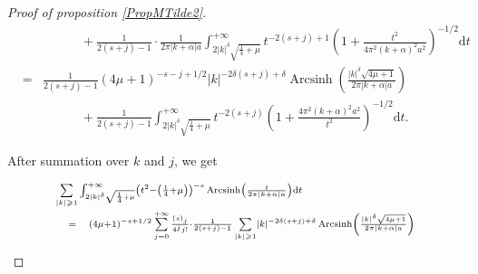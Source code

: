 \documentclass{jams-l}
\theoremstyle{definition}
\theoremstyle{remark}
\numberwithin{equation}{section}
\DeclareMathOperator{\arcsinh}{Arcsinh}
\begin{document}
\begin{proof}[Proof of proposition \ref{PropMTilde2}]
\[\begin{array}{lll}
                            && \qquad \quad \scriptstyle + \frac{1}{2 \left( s + j \right) - 1} \cdot \frac{1}{2 \pi \left \vert k + \alpha \right \vert a} \int_{2 \left \vert k \right \vert^{\delta} \sqrt{\frac{1}{4} + \mu}}^{+ \infty} t^{- 2 \left( s + j \right) + 1} \left( 1 + \frac{t^2}{4 \pi^2 \left( k + \alpha \right)^2 a^2} \right)^{-1/2} \mathrm{d}t \\[1em]
                            
                            & \scriptstyle = & \scriptstyle \frac{1}{2 \left( s + j \right) - 1} \left( 4 \mu + 1 \right)^{-s-j+1/2} \left \vert k \right \vert^{- 2 \delta \left( s + j \right) + \delta} \arcsinh \left( \frac{\left \vert k \right \vert^{\delta} \sqrt{4 \mu + 1}}{2 \pi \left \vert k + \alpha \right \vert a} \right) \\[1em]
                            
                            && \scriptstyle \qquad \quad + \frac{1}{2 \left( s + j \right) - 1} \int_{2 \left \vert k \right \vert^{\delta} \sqrt{\frac{1}{4} + \mu}}^{+ \infty} t^{- 2 \left( s + j \right)} \left( 1 + \frac{4 \pi^2 \left( k + \alpha \right)^2 a^2}{t^2} \right)^{-1/2} \mathrm{d}t.
                        \end{array} \]
                    
                    \noindent After summation over $k$ and $j$, we get
                    
                    \begin{equation}
                    \label{EqArcsinhBreakingApart}
                        \begin{array}{lll}
                            \multicolumn{3}{l}{\scriptstyle \sum\limits_{\left \vert k \right \vert \geqslant 1} \int_{2 \left \vert k \right \vert^{\delta} \sqrt{\frac{1}{4} + \mu}}^{+ \infty} \left( t^2 - \left( \frac{1}{4} + \mu \right) \right)^{-s} \arcsinh \left( \frac{t}{2 \pi \left \vert k + \alpha \right \vert a} \right) \mathrm{d}t} \\[1em]
                            
                            & \scriptstyle = & \scriptstyle \left( 4 \mu + 1 \right)^{-s+1/2} \sum\limits_{j = 0}^{+\infty} \frac{\left( s \right)_j}{4^j j!} \cdot \frac{1}{2 \left( s + j \right) - 1} \sum\limits_{\left \vert k \right \vert \geqslant 1}  \left \vert k \right \vert^{- 2 \delta \left( s + j \right) + \delta} \arcsinh \left( \frac{\left \vert k \right \vert^{\delta} \sqrt{4 \mu + 1}}{2 \pi \left \vert k + \alpha \right \vert a} \right) \\[1em]
                            

\end{array}
\end{equation}
\end{proof}
\end{document}
